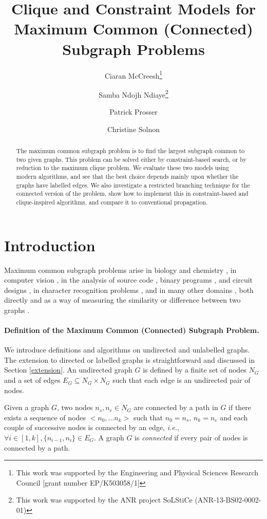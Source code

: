 \documentclass{llncs}
\title{Clique and Constraint Models for Maximum Common (Connected) Subgraph Problems}
\author{Ciaran McCreesh\thanks{This work was supported by the Engineering and Physical Sciences
    Research Council [grant number EP/K503058/1]}\inst{1} \and Samba Ndojh Ndiaye\thanks{This work
was supported by the ANR project SoLStiCe (ANR-13-BS02-0002-01)}\inst{2} \and Patrick
Prosser\inst{1} \and Christine Solnon\samethanks[2] \inst{3}}
\institute{University of Glasgow, Glasgow, Scotland \and
Universit\'e Lyon 1, LIRIS, UMR5205, F-69621, France  \and INSA-Lyon, LIRIS, UMR5205, F-69621, France}
\begin{document}
\maketitle

\begin{abstract}
    The maximum common subgraph problem is to find the largest subgraph common to two given graphs.
    This problem can be solved either by constraint-based search, or by reduction to the maximum
    clique problem. We evaluate these two models using modern algorithms, and see that the best
    choice depends mainly upon whether the graphs have labelled edges. We also investigate a
    restricted branching technique for the connected version of the problem, show how to implement
    this in constraint-based and clique-inspired algorithms, and compare it to conventional
    propagation.
\end{abstract}

\section{Introduction}


Maximum common subgraph problems arise in biology and chemistry
\cite{DBLP:journals/jcamd/RaymondW02a,Ehrlich:2011}, in computer vision
\cite{DBLP:journals/jair/CookH94}, in the analysis of source code
\cite{DBLP:journals/tkde/DjokoCH97}, binary programs \cite{DBLP:conf/icics/GaoRS08}, and circuit
designs \cite{DBLP:journals/jair/CookH94}, in character recognition problems \cite{SIWEILU1991617},
and in many other domains \cite{Shasha:2002:AAT:543613.543620}, both directly and as a way of
measuring the similarity or difference between two graphs
\cite{DBLP:journals/prl/Bunke97,DBLP:journals/prl/FernandezV01,KriegeThesis}. 

\paragraph{Definition of the Maximum Common (Connected) Subgraph Problem.}
We introduce definitions and algorithms on undirected and unlabelled graphs. The extension to directed or labelled graphs is straightforward and discussed in Section \ref{extension}. An undirected graph $G$ is defined by a finite set of nodes $N_G$ and a set of edges $E_G\subseteq N_G\times N_G$ such that each edge is an undirected pair of nodes.

Given a graph $G$, two nodes $n_s, n_e \in N_G$ are connected by a path in $G$ if there exists a sequence of nodes $<n_0,\ldots n_k>$ such that $n_0=n_s$, $n_k=n_e$ and each couple of successive nodes is connected by an edge, {\em i.e.}, $\forall i\in [1,k], \{n_{i-1},n_i\}\in E_G$. A graph $G$ is \emph{connected} if every pair of nodes is connected by a path.
\end{document}
